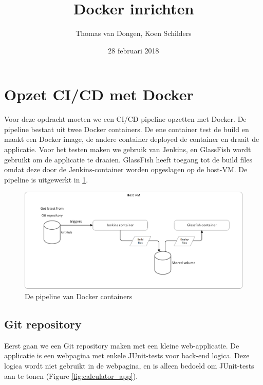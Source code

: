\documentclass[12pt]{article}
\title{Docker inrichten}
\author{Thomas van Dongen, Koen Schilders}
\date{28 februari 2018}
\begin{document}
\begin{titlepage}
\maketitle
\end{titlepage}



\section{Opzet CI/CD met Docker}
Voor deze opdracht moeten we een CI/CD pipeline opzetten met Docker. De pipeline bestaat uit twee Docker containers. De ene container test de build en maakt een Docker image, de andere container deployed de container en draait de applicatie. Voor het testen maken we gebruik van Jenkins, en GlassFish wordt gebruikt om de applicatie te draaien. GlassFish heeft toegang tot de build files omdat deze door de Jenkins-container worden opgeslagen op de host-VM. De pipeline is uitgewerkt in \figurename \ref{fig:cicd_pipeline}.
\newline
\begin{figure}[H]
	\includegraphics[width=\textwidth]{images/DockerPipeline.png}
	\caption{De pipeline van Docker containers\label{fig:cicd_pipeline}}
\end{figure}

\subsection{Git repository}
Eerst gaan we een Git repository maken met een kleine web-applicatie. De applicatie is een webpagina met enkele JUnit-tests voor back-end logica. Deze logica wordt niet gebruikt in de webpagina, en is alleen bedoeld om JUnit-tests aan te tonen (Figure \ref{fig:calculator_app}).
\end{document}
